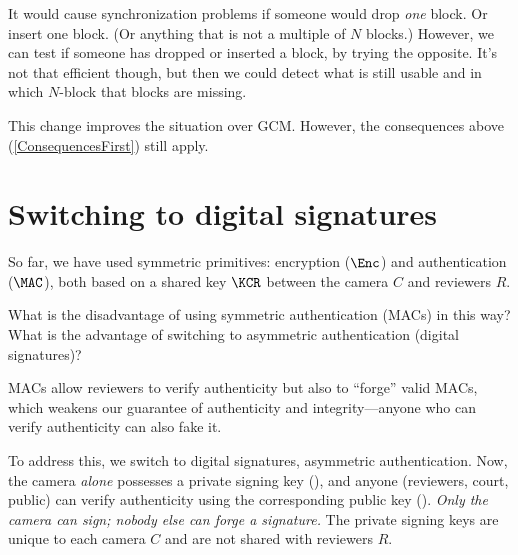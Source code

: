 It would cause synchronization problems if someone would drop \emph{one} block.
Or insert one block.
(Or anything that is not a multiple of \(N\) blocks.)
However, we can test if someone has dropped or inserted a block, by trying the 
opposite.
It's not that efficient though, but then we could detect what is still usable 
and in which \(N\)-block that blocks are missing.

This change improves the situation over \ac{GCM}\@.
However, the consequences above (\cref{ConsequencesFirst}) still apply.


\section{Switching to digital signatures}\label{DigitalSignatures}


So far, we have used symmetric primitives: encryption (\(\Enc\)) and
authentication (\(\MAC\)), both based on a shared key \(\KCR\) between
the camera \(C\) and reviewers \(R\).

\begin{exercise}
  What is the disadvantage of using symmetric authentication (MACs) in this 
  way?
  What is the advantage of switching to asymmetric authentication (digital 
  signatures)?
\end{exercise}

MACs allow reviewers to verify authenticity but also to \enquote{forge} valid 
MACs, which weakens our guarantee of authenticity and integrity---anyone who 
can verify authenticity can also fake it.

To address this, we switch to digital signatures, \ie asymmetric
authentication.
Now, the camera \emph{alone} possesses a private signing key (\SKC), and anyone 
(reviewers, court, public) can verify authenticity using the corresponding 
public key (\VKC).
\emph{Only the camera can sign; nobody else can forge a signature.}
The private signing keys are unique to each camera \(C\) and are not shared 
with reviewers \(R\).

